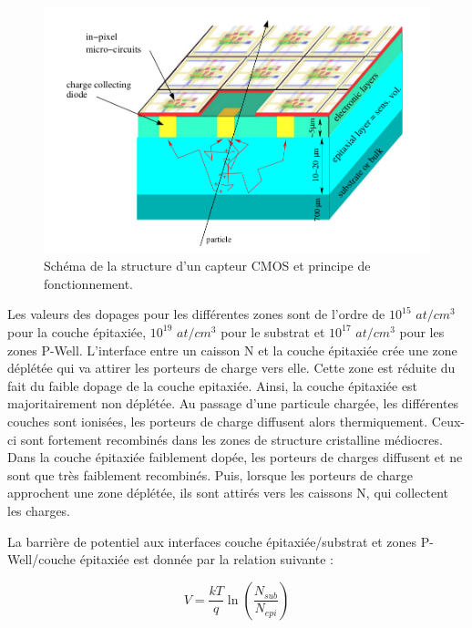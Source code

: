   \begin{figure}[!htb]
   \begin{center} 
    \includegraphics[scale=0.40]{./figures/schema_principe_CMOS.png}
    \caption{Sch\'ema de la structure d'un capteur CMOS et principe de fonctionnement.}
    \label{fig:principe}
   \end{center}
  \end{figure}
  
  \medskip
  
  Les valeurs des dopages pour les diff\'erentes zones sont de l'ordre de $10^{15}$ $at/cm^3$ pour la couche \'epitaxi\'ee, $10^{19}$ $at/cm^3$ pour le substrat et $10^{17}$ $at/cm^3$ pour les zones P-Well. L'interface entre un caisson N et la couche \'epitaxi\'ee cr\'ee une zone d\'epl\'et\'ee qui va attirer les porteurs de charge vers elle. Cette zone est r\'eduite du fait du faible dopage de la couche epitaxi\'ee. Ainsi, la couche \'epitaxi\'ee est majoritairement non d\'epl\'et\'ee. Au passage d'une particule charg\'ee, les diff\'erentes couches sont ionis\'ees, les porteurs de charge diffusent alors thermiquement. Ceux-ci sont fortement recombin\'es dans les zones de structure cristalline m\'ediocres. Dans la couche \'epitaxi\'ee faiblement dop\'ee, les porteurs de charges diffusent et ne sont que très faiblement recombin\'es. Puis, lorsque les porteurs de charge approchent une zone d\'epl\'et\'ee, ils sont attir\'es vers les caissons N, qui collectent les charges.
  
  \medskip
  
  La barri\`ere de potentiel aux interfaces couche \'epitaxi\'ee/substrat et zones P-Well/couche \'epitaxi\'ee est donn\'ee par la relation suivante : 
  
  \begin{equation}
   V = \dfrac{kT}{q} \ln \left( \dfrac{N_{sub}}{N_{epi}} \right)
  \end{equation}
   

